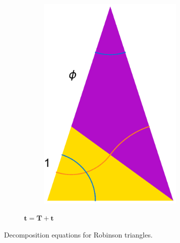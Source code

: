 \documentclass[
  oneside,
  11pt, a4paper,
  footinclude=true,
  headinclude=true,
  cleardoublepage=empty
]{scrbook}
\begin{document}
\begin{figure}[H]
\begin{subfigure}[b]{\textwidth}
\begin{subfigure}[b]{0.4\textwidth}
                \includegraphics[scale=0.3]{RobSkinnySub}
        \end{subfigure}   
        \caption*{$\textbf{t}=\textbf{T}+\textbf{t}$}
        \label{fig:RobSubThinAgain}
        \end{subfigure}
        \caption[Robinson Triangles Deflation Again]{Decomposition equations for Robinson triangles.}
        \label{fig:RobSubsAgain}
\end{figure}
\end{document}
